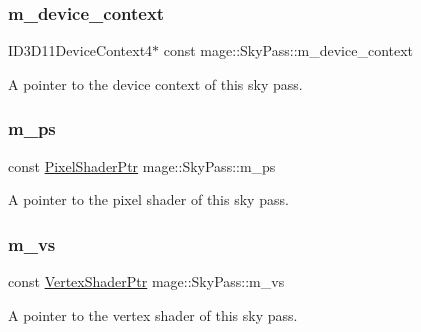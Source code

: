 \subsubsection{\texorpdfstring{m\+\_\+device\+\_\+context}{m\_device\_context}}
{\footnotesize\ttfamily I\+D3\+D11\+Device\+Context4$\ast$ const mage\+::\+Sky\+Pass\+::m\+\_\+device\+\_\+context\hspace{0.3cm}{\ttfamily [private]}}

A pointer to the device context of this sky pass. \hypertarget{classmage_1_1_sky_pass_a9f975229c5a37d28a728117c1fb64ab8}{}\label{classmage_1_1_sky_pass_a9f975229c5a37d28a728117c1fb64ab8} 
\subsubsection{\texorpdfstring{m\+\_\+ps}{m\_ps}}
{\footnotesize\ttfamily const \hyperlink{namespacemage_acbec875bb5e5e085e32ed244a24d2b6f}{Pixel\+Shader\+Ptr} mage\+::\+Sky\+Pass\+::m\+\_\+ps\hspace{0.3cm}{\ttfamily [private]}}

A pointer to the pixel shader of this sky pass. \hypertarget{classmage_1_1_sky_pass_abe56d3bff2f38f8959e9b5f4c00a69ff}{}\label{classmage_1_1_sky_pass_abe56d3bff2f38f8959e9b5f4c00a69ff} 
\subsubsection{\texorpdfstring{m\+\_\+vs}{m\_vs}}
{\footnotesize\ttfamily const \hyperlink{namespacemage_a1f19b094f771e30bc0a6c1cebcc0dd58}{Vertex\+Shader\+Ptr} mage\+::\+Sky\+Pass\+::m\+\_\+vs\hspace{0.3cm}{\ttfamily [private]}}

A pointer to the vertex shader of this sky pass. 